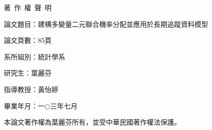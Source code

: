 \nocite{*}                  %
\ifodd{} \else \thispagestyle{plain}\mbox{}\clearpage \fi
{}    %


{}%
\ifodd{} \else \thispagestyle{empty}\mbox{}\clearpage\fi



\cleardoublepage
\thispagestyle{empty}
\begin{center}
    \huge 著~作~權~聲~明
\end{center}

\vspace*{1cm}
論文題目：建構多變量二元聯合機率分配並應用於長期追蹤資料模型

論文頁數：85頁

系所組別：統計學系

研究生：葉麗芬

指導教授：黃怡婷

畢業年月：一$\bigcirc$三年七月

本論文著作權為葉麗芬所有，並受中華民國著作權法保護。



